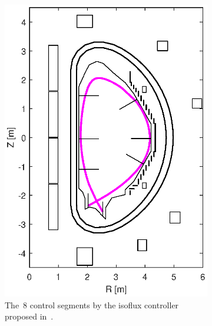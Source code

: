 \begin{figure}
\begin{subfigure}[b]{0.32\textwidth}
		\includegraphics[width=\textwidth]{Chp3/8_gaps.eps} 
		\caption{The~8 control segments by the isoflux controller proposed in~\cite{miyata2013study}.\label{figure:8_gaps}}
	\end{subfigure}
	~
	\begin{subfigure}[b]{0.32\textwidth}

\end{subfigure}
\end{figure}
